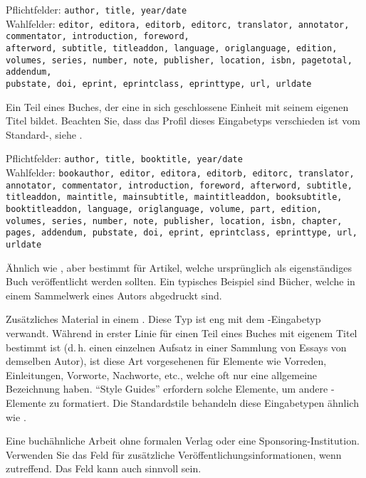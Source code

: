 \documentclass{ltxdockit}[2011/03/25]
\begin{document}
\begin{typelist}
Pflichtfelder: \texttt{author, title, year/date}\\
Wahlfelder: \texttt{editor, editora, editorb, editorc, translator,
annotator, commentator, introduction,
foreword,\\ afterword, subtitle, titleaddon, language, origlanguage, edition, volumes, series, number, 
note, publisher, location, isbn, pagetotal, addendum,\\ pubstate, doi, eprint, eprintclass, eprinttype, 
url, urldate}



Ein Teil eines Buches, der eine in sich geschlossene Einheit
mit seinem eigenen Titel bildet. Beachten Sie, dass das Profil dieses
Eingabetyps verschieden ist vom Standard-\bibtex, siehe . 

Pflichtfelder: \texttt{author, title, booktitle, year/date}\\ 
Wahlfelder: \texttt{bookauthor, editor,
editora, editorb, editorc, translator, annotator, commentator, introduction,
foreword, afterword, subtitle,\\ titleaddon, maintitle, mainsubtitle,
maintitleaddon, booksubtitle, book\-titleaddon, language, origlanguage, volume,
part, edition, volumes, series, number, note, publisher, location, isbn,
chapter, pages, addendum, pubstate, doi, eprint, eprintclass, eprinttype, url,
urldate}


Ähnlich wie , aber bestimmt für Artikel,
welche ursprünglich als eigenständiges Buch veröffentlicht werden sollten. Ein
typisches Beispiel sind Bücher, welche in einem Sammelwerk eines Autors abgedruckt
sind. 



Zusätzliches Material in einem . Diese Typ ist eng mit dem
-Eingabetyp verwandt. Während  in erster Linie
für einen Teil eines Buches mit eigenem Titel bestimmt ist (d.\,h. einen
einzelnen Aufsatz in einer Sammlung von Essays von demselben Autor), ist diese
Art vorgesehenen für Elemente wie Vorreden, Einleitungen, Vorworte, Nachworte,
etc., welche oft nur eine allgemeine Bezeichnung haben. "`Style Guides"' erfordern
solche Elemente, um andere -Elemente zu formatiert. Die
Standardstile behandeln diese Eingabetypen ähnlich wie . 


Eine buchähnliche Arbeit ohne formalen Verlag oder eine Sponsoring-Institution.
Verwenden Sie das Feld  für zusätzliche
Veröffentlichungsinformationen, wenn zutreffend. Das Feld  kann
auch sinnvoll sein. 


\end{typelist}
\end{document}

